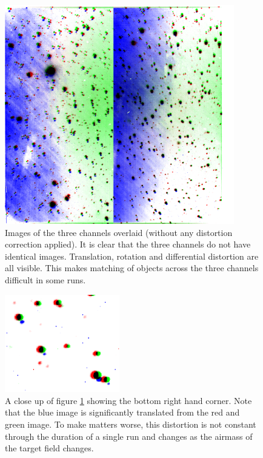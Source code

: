 \begin{figure}
  \centering
  \includegraphics[width=100mm]{images/overlay_multiply.png}
  \caption{Images of the three channels overlaid (without any distortion correction applied). It is clear that the three channels do not have identical images. Translation, rotation and differential distortion are all visible. This makes matching of objects across the three channels difficult in some runs. }
\label{fig:nonoverlap}
\end{figure}

\begin{figure}
  \centering
  \includegraphics[width=50mm]{images/overlay_multiply_closeup.png}
  \caption{A close up of figure \ref{fig:nonoverlap} showing the bottom right hand corner. Note that the blue image is significantly translated from the red and green image. To make matters worse, this distortion is not constant through the duration of a single run and changes as the airmass of the target field changes.}
\label{fig:nonoverlapzoom}
\end{figure}


